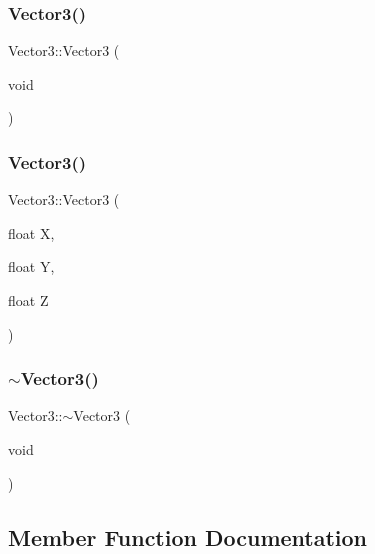 \subsubsection{\texorpdfstring{Vector3()}{Vector3()}\hspace{0.1cm}{\footnotesize\ttfamily [1/2]}}
{\footnotesize\ttfamily Vector3\+::\+Vector3 (\begin{DoxyParamCaption}\item[{void}]{ }\end{DoxyParamCaption})}

\mbox{\label{classVector3_a139c27d257255f372ff858b1b51f0ccc}} 
\subsubsection{\texorpdfstring{Vector3()}{Vector3()}\hspace{0.1cm}{\footnotesize\ttfamily [2/2]}}
{\footnotesize\ttfamily Vector3\+::\+Vector3 (\begin{DoxyParamCaption}\item[{float}]{X,  }\item[{float}]{Y,  }\item[{float}]{Z }\end{DoxyParamCaption})}

\mbox{\label{classVector3_a17fc19421d16ac167d99766aa167a9a3}} 
\subsubsection{\texorpdfstring{$\sim$\+Vector3()}{~Vector3()}}
{\footnotesize\ttfamily Vector3\+::$\sim$\+Vector3 (\begin{DoxyParamCaption}\item[{void}]{ }\end{DoxyParamCaption})}



\subsection{Member Function Documentation}
\mbox{\label{classVector3_ae5218ba9e630cc051924d1b3b66d9c62}} 
